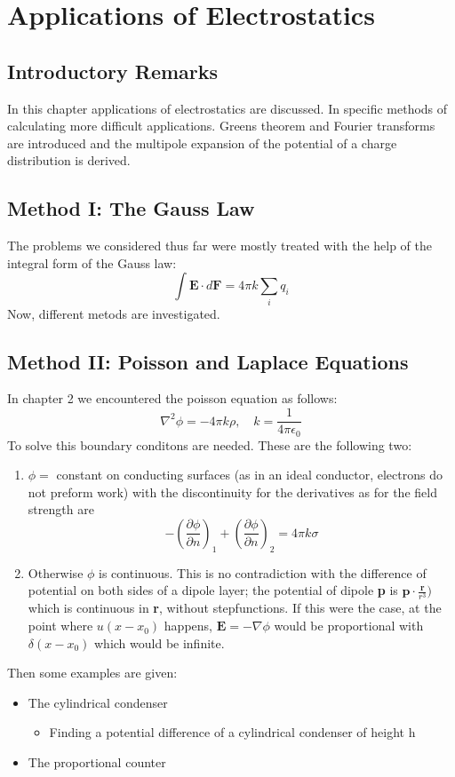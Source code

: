 \chapter{Applications of Electrostatics}
\section{Introductory Remarks}
In this chapter applications of electrostatics are discussed. In specific methods of calculating more difficult applications.
Greens theorem and Fourier transforms are introduced and the multipole expansion of the potential of a charge distribution is derived.
\section{Method I: The Gauss Law}
The problems we considered thus far were mostly treated with the help of the integral form of the Gauss law:
\begin{equation}
    \int \textbf{E} \cdot d\textbf{F} = 4\pi k \sum_i q_i
\end{equation}
Now, different metods are investigated.
\section{Method II: Poisson and Laplace Equations}
In chapter 2 we encountered the poisson equation as follows:
\begin{equation}
    \nabla^2\phi =-4\pi k \rho, \quad k = \frac{1}{4\pi \epsilon_0}
\end{equation}
To solve this boundary conditons are needed. These are the following two:
\begin{enumerate}
    \item $\phi =$ constant on conducting surfaces (as in an ideal conductor, electrons do not preform work) with the discontinuity for the derivatives
     as for the field strength are
     \begin{equation}
        \label{eq:pois&lapl-potential}
         -\left(\frac{\partial\phi}{\partial n}\right)_1 +\left(\frac{\partial\phi}{\partial n}\right)_2 = 4\pi k \sigma
     \end{equation}
     \item Otherwise $\phi$ is continuous. This is no contradiction with the difference of potential on both sides of a dipole layer; the potential of dipole \textbf{p} is $\textbf{p} \cdot \frac{\textbf{r}}{r^3})$ 
     which is continuous in \textbf{r}, without stepfunctions. If this were the case, at the point where $u(x-x_0)$ happens, $\textbf{E} = -\nabla \phi$ would be proportional with
     $\delta(x-x_0)$ which would be infinite.
\end{enumerate}
Then some examples are given:
\begin{itemize}
    \item The cylindrical condenser
    \begin{itemize}
        \item Finding a potential difference of a cylindrical condenser of height h
    \end{itemize}
    \item The proportional counter
\end{itemize}
